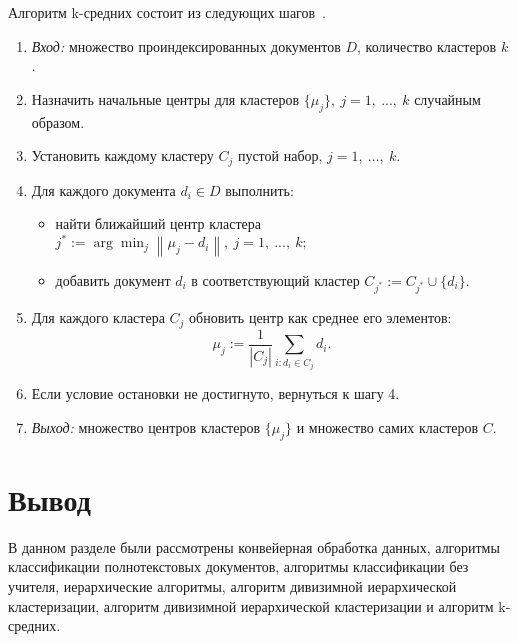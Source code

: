 Алгоритм k-средних состоит из следующих шагов~\cite{main-book}.
\begin{enumerate}
	\item \textit{Вход:} множество проиндексированных документов \( D \), количество кластеров \( k \). %
	\item Назначить начальные центры для кластеров \( \{ \mu_j \},\ j = 1,\ ...,\ k \) случайным образом. %
	\item Установить каждому кластеру \( C_j \) пустой набор, \( j = 1,\ ...,\ k \). %
	\item Для каждого документа \( d_i \in D \) выполнить: %
	\begin{itemize}
		\item найти ближайший центр кластера \( j^* := \arg \min_j \left\| \mu_j - d_i \right\|,\ j = 1,\ ...,\ k; \) %
		\item добавить документ \( d_i \) в соответствующий кластер \( C_{j^*} := C_{j^*} \cup \{d_i\}. \) %
	\end{itemize}
	\item Для каждого кластера \( C_j \) обновить центр как среднее его элементов: %
	\[ \mu_j := \frac{1}{|C_j|} \sum_{i:d_i \in C_j} d_i. \]
	\item Если условие остановки не достигнуто, вернуться к шагу 4. %
	\item \textit{Выход:} множество центров кластеров \( \{ \mu_j \} \) и множество самих кластеров \( C \). %
\end{enumerate}

\section *{Вывод}
В данном разделе были рассмотрены конвейерная обработка данных, алгоритмы классификации полнотекстовых документов, алгоритмы классификации без учителя, иерархические алгоритмы, алгоритм дивизимной иерархической кластеризации, алгоритм дивизимной иерархической кластеризации и алгоритм k-средних.

